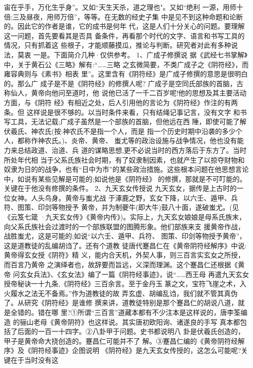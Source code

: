 \documentclass[12pt,UTF8]{ctexbook}
\begin{document}
宙在乎手，万化生乎身”。又如“天生天杀，道之理也"。又如“绝利
一源，用师十倍;三及昼夜，用师万倍”，等等。在无数的经史子集
中是见不到这种命题和论断的。因此它的作者是谁，它的成书是何年
代，这是人们十分关心的问题。要理解这一问题，首先要看其是否具
备条件，再看那个时代的文字、语言和书写工具的情况，只有抓着这
些根子，才能顺藤摸瓜，推论与判断。研究者对此有多种说法，莫衷
一是。下面简介几种·仅供参考。
1、广成子修撰说
据《武经七书掌解》中，关于黄石公《三略》解有:“……三略
之玄微简要，不类广成子之《阴符经》，而雍容典则与《素书》相表
里”。这里含有《阴符经》是广成子修撰的意思是很明白的。那么广
成子是不是《阴符经》的修撰人呢?
广成子是空同氏部族的首脑，古称仙人，黄帝向他问至道时，他
说他已活了一千二百岁呢!他的思想及其主要活动方面，与《阴符
经》有相近之处，后人引用他的言论为《阴符经》作注的有两条。但
这样说是很不够的。以当时条件来看，只有结绳记事记言，没有文字
和书写工具，无法记载;广成子虽然是一个部族的首脑，但他远在西
陲，即使可能了解伏羲氏、神农氏(按:神农氏不是指一个人，而是
指一个历史时期中沿袭的多少个人，都称作神农氏。)、炎帝、黄帝、
蚩尤等的政治设施与战争情况，他也没有能力来总结政道、治道、兵
道的谋略思想,更不必说当时的西方落后于东方了。当时所处年代相
当于父系氏族社会时期，有了奴隶制因素，也就产生了以掠夺财物和
奴隶为日的的战争，也有“日中为市”的某些政治措施。这些根本问题在他思想言论中，如说有某些见解是可能的;如说他是《阴符经》
的修撰，那就是不可叮能的。关键在于他没有修撰的条件。
2、九天玄女传授说
九天玄女，据传是上古时的一位女神。人头鸟身。黄帝与蚩尤战
于涿鹿之野，玄女下降，以六壬、遁甲、兵符、图策、印剑等物授予
黄帝，并为制夔牛(即大牛)鼓八十面，遂破蚩尤。(见《云笈七箴
·九天玄女传》《黄帝内传》)。实际上，九天玄女娘娘是母系氏族末，
向父系氏族社会过渡时的一个部族联盟的图腾形象。他们部族来支
援黄帝作战，战胜蚩尤，这是可能的;如说“以六壬、遁甲、兵符、
图策、印剑等物授予黄帝”，这是道教徒的乱编胡诌了。还有个道教
徒唐代蹇昌仁在《黄帝阴符经解序》中说:黄帝得玄女授《阴符》精
义，能内合天机，外契人事，则三百言实玄女之所授，而百言乃黄帝
之演绎者也，故辞要而旨远，义深而理渊。这个蹇昌仁还根据《黄帝
问玄女兵法》、《玄女法》编了一篇《阴符经事迹》，说“……西王母
再遣九天玄女授帝秘诀一十九条,《阴符经》三百余言。至于金丹玉
篆之文，宝符飞崖之术，入火履水之法无不备焉。”作为道教徒的故
弄玄虚、胡编乱诌，我们就不管其真伪了。从研究《阴符经》是谁修
撰来讲，道教徒特别是那个蹇昌仁的胡说八道，就是全错的。错在哪
里?①所谓“三百言”道藏本都有不少注本是这样说的，唐李筌编造
的骊山老母《黄帝阴符》也这样说。其实唐初欧阳询、诸遂良的手写
真本都包括了后面的一百一十四字。②八卦甲于问题。史书都说明八
卦是伏羲氏创造的，甲子是黄帝命大挠创造的。蹇昌仁可能并不了
解。③蹇昌仁编的《黄帝阴符经解序》及《阴符经事迹》企图说明
《阴符经》是九天玄女传授的，这怎么可能呢?关键在于当时没有这
\end{document}
